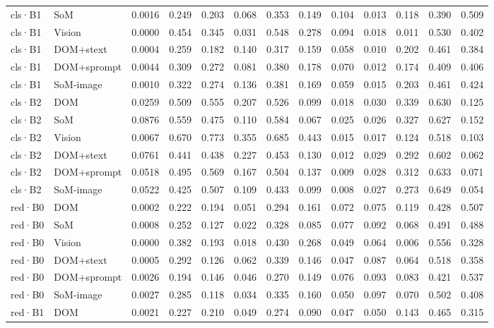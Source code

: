 \begin{table}[tp]
\begin{tabular}{@{}lllllllllllll@{}}
cls·B1 & SoM & 0.0016 & 0.249 & 0.203 & 0.068 & 0.353 & 0.149 & 0.104 & 0.013 & 0.118 & 0.390 & 0.509 \\
cls·B1 & Vision & 0.0000 & 0.454 & 0.345 & 0.031 & 0.548 & 0.278 & 0.094 & 0.018 & 0.011 & 0.530 & 0.402 \\
cls·B1 & DOM+stext & 0.0004 & 0.259 & 0.182 & 0.140 & 0.317 & 0.159 & 0.058 & 0.010 & 0.202 & 0.461 & 0.384 \\
cls·B1 & DOM+sprompt & 0.0044 & 0.309 & 0.272 & 0.081 & 0.380 & 0.178 & 0.070 & 0.012 & 0.174 & 0.409 & 0.406 \\
cls·B1 & SoM-image & 0.0010 & 0.322 & 0.274 & 0.136 & 0.381 & 0.169 & 0.059 & 0.015 & 0.203 & 0.461 & 0.424 \\
cls·B2 & DOM & 0.0259 & 0.509 & 0.555 & 0.207 & 0.526 & 0.099 & 0.018 & 0.030 & 0.339 & 0.630 & 0.125 \\
cls·B2 & SoM & 0.0876 & 0.559 & 0.475 & 0.110 & 0.584 & 0.067 & 0.025 & 0.026 & 0.327 & 0.627 & 0.152 \\
cls·B2 & Vision & 0.0067 & 0.670 & 0.773 & 0.355 & 0.685 & 0.443 & 0.015 & 0.017 & 0.124 & 0.518 & 0.103 \\
cls·B2 & DOM+stext & 0.0761 & 0.441 & 0.438 & 0.227 & 0.453 & 0.130 & 0.012 & 0.029 & 0.292 & 0.602 & 0.062 \\
cls·B2 & DOM+sprompt & 0.0518 & 0.495 & 0.569 & 0.167 & 0.504 & 0.137 & 0.009 & 0.028 & 0.312 & 0.633 & 0.071 \\
cls·B2 & SoM-image & 0.0522 & 0.425 & 0.507 & 0.109 & 0.433 & 0.099 & 0.008 & 0.027 & 0.273 & 0.649 & 0.054 \\
red·B0 & DOM & 0.0002 & 0.222 & 0.194 & 0.051 & 0.294 & 0.161 & 0.072 & 0.075 & 0.119 & 0.428 & 0.507 \\
red·B0 & SoM & 0.0008 & 0.252 & 0.127 & 0.022 & 0.328 & 0.085 & 0.077 & 0.092 & 0.068 & 0.491 & 0.488 \\
red·B0 & Vision & 0.0000 & 0.382 & 0.193 & 0.018 & 0.430 & 0.268 & 0.049 & 0.064 & 0.006 & 0.556 & 0.328 \\
red·B0 & DOM+stext & 0.0005 & 0.292 & 0.126 & 0.062 & 0.339 & 0.146 & 0.047 & 0.087 & 0.064 & 0.518 & 0.358 \\
red·B0 & DOM+sprompt & 0.0026 & 0.194 & 0.146 & 0.046 & 0.270 & 0.149 & 0.076 & 0.093 & 0.083 & 0.421 & 0.537 \\
red·B0 & SoM-image & 0.0027 & 0.285 & 0.118 & 0.034 & 0.335 & 0.160 & 0.050 & 0.097 & 0.070 & 0.502 & 0.408 \\
red·B1 & DOM & 0.0021 & 0.227 & 0.210 & 0.049 & 0.274 & 0.090 & 0.047 & 0.050 & 0.143 & 0.465 & 0.315 \\

\end{tabular}
\end{table}
